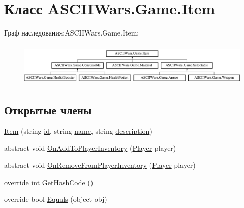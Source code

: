 \hypertarget{class_a_s_c_i_i_wars_1_1_game_1_1_item}{}\section{Класс A\+S\+C\+I\+I\+Wars.\+Game.\+Item}
\label{class_a_s_c_i_i_wars_1_1_game_1_1_item}
Граф наследования\+:A\+S\+C\+I\+I\+Wars.\+Game.\+Item\+:\begin{figure}[H]
\begin{center}
\leavevmode
\includegraphics[height=2.100000cm]{class_a_s_c_i_i_wars_1_1_game_1_1_item}
\end{center}
\end{figure}
\subsection*{Открытые члены}
\begin{DoxyCompactItemize}
\item 
\hyperlink{class_a_s_c_i_i_wars_1_1_game_1_1_item_ae9b7ebce1c577c6d4e142f7d8f736ec5}{Item} (string \hyperlink{class_a_s_c_i_i_wars_1_1_game_1_1_item_a744d51f7684a4e46a1f834f8666db58e}{id}, string \hyperlink{class_a_s_c_i_i_wars_1_1_game_1_1_item_a994b9ec5f10c123e4345da159c090091}{name}, string \hyperlink{class_a_s_c_i_i_wars_1_1_game_1_1_item_a6ff41e953ccebc64a8df8f8c434535a0}{description})
\item 
abstract void \hyperlink{class_a_s_c_i_i_wars_1_1_game_1_1_item_aec0355b7a9f647ef24897b95563f70d1}{On\+Add\+To\+Player\+Inventory} (\hyperlink{class_a_s_c_i_i_wars_1_1_game_1_1_player}{Player} player)
\item 
abstract void \hyperlink{class_a_s_c_i_i_wars_1_1_game_1_1_item_a52412546f837bfc65a3aa9d728fa142f}{On\+Remove\+From\+Player\+Inventory} (\hyperlink{class_a_s_c_i_i_wars_1_1_game_1_1_player}{Player} player)
\item 
override int \hyperlink{class_a_s_c_i_i_wars_1_1_game_1_1_item_aa503cb0e59f19deb5124271048735de4}{Get\+Hash\+Code} ()
\item 
override bool \hyperlink{class_a_s_c_i_i_wars_1_1_game_1_1_item_a8a91f74db078fbb15657f28ef92155f8}{Equals} (object obj)
\end{DoxyCompactItemize}
